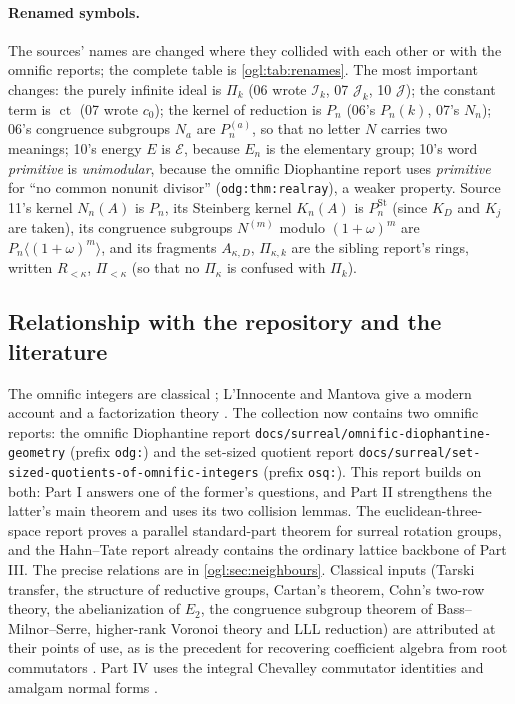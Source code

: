 \documentclass[11pt,oneside]{article}
\numberwithin{equation}{section}
\theoremstyle{definition}
\theoremstyle{remark}
\newcommand{\cE}{\mathcal E}
\newcommand{\ct}{\operatorname{ct}}
\newcommand{\St}{\operatorname{St}}
\newcommand{\replabel}[1]{\nolinkurl{#1}}
\newcommand{\fn}[1]{\nolinkurl{#1}}
\begin{document}
\paragraph{Renamed symbols.} The sources' names are changed where they
collided with each other or with the omnific reports; the complete table is
\cref{ogl:tab:renames}. The most important changes: the purely infinite ideal
is $\Pi_k$ (06 wrote $\mathcal I_k$, 07 $\mathcal J_k$, 10 $\mathcal J$); the
constant term is $\ct$ (07 wrote $c_0$); the kernel of reduction is $P_n$ (06's
$P_n(k)$, 07's $N_n$); 06's congruence subgroups $N_a$ are $P_n^{(a)}$, so that
no letter $N$ carries two meanings; 10's energy $E$ is $\cE$, because $E_n$ is
the elementary group; 10's word \emph{primitive} is \emph{unimodular},
because the omnific Diophantine report uses \emph{primitive} for ``no common
nonunit divisor'' (\replabel{odg:thm:realray}), a weaker property.
Source 11's kernel $N_n(A)$ is $P_n$, its Steinberg kernel $K_n(A)$ is
$P_n^{\St}$ (since $K_D$ and $K_j$ are taken), its congruence subgroups
$N^{(m)}$ modulo $(1+\omega)^m$ are $P_n\langle(1+\omega)^m\rangle$, and its
fragments $A_{\kappa,D}$, $\Pi_{\kappa,k}$ are the sibling report's rings,
written $R_{<\kappa}$, $\Pi_{<\kappa}$ (so that no $\Pi_\kappa$ is confused
with $\Pi_k$).

\subsection{Relationship with the repository and the literature}\label{ogl:sub:repo}

The omnific integers are classical \cite{Conway,Gonshor}; L'Innocente and
Mantova give a modern account and a factorization theory \cite{LM}. The
collection now contains two omnific reports: the omnific Diophantine report
\fn{docs/surreal/omnific-diophantine-geometry} (prefix \texttt{odg:}) and the
set-sized quotient report \fn{docs/surreal/set-sized-quotients-of-omnific-integers}
(prefix \texttt{osq:}). This report builds on both: Part I answers one of the
former's questions, and Part II strengthens the latter's main theorem and uses
its two collision lemmas. The euclidean-three-space report proves a parallel
standard-part theorem for surreal rotation groups, and the Hahn--Tate report
already contains the ordinary lattice backbone of Part III. The precise
relations are in \cref{ogl:sec:neighbours}. Classical inputs (Tarski transfer,
the structure of reductive groups, Cartan's theorem, Cohn's two-row theory,
the abelianization of $E_2$, the congruence subgroup theorem of
Bass--Milnor--Serre, higher-rank Voronoi theory and LLL reduction) are
attributed at their points of use, as is the precedent for recovering
coefficient algebra from root commutators \cite{Voronetsky}. Part IV uses the
integral Chevalley commutator identities \cite{Geck,HVZ} and amalgam normal
forms \cite{Serre}.
\end{document}
